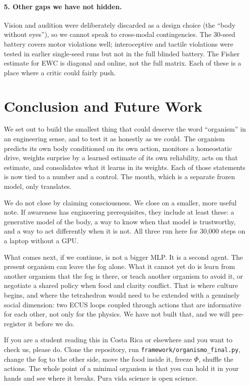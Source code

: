 \documentclass[11pt,a4paper]{article}
\begin{document}
\paragraph{5. Other gaps we have not hidden.} Vision and audition were deliberately discarded as a design choice (the ``body without eyes''), so we cannot speak to cross-modal contingencies. The 30-seed battery covers motor violations well; interoceptive and tactile violations were tested in earlier single-seed runs but not in the full blinded battery. The Fisher estimate for EWC is diagonal and online, not the full matrix. Each of these is a place where a critic could fairly push.

\section{Conclusion and Future Work}

We set out to build the smallest thing that could deserve the word ``organism'' in an engineering sense, and to test it as honestly as we could. The organism predicts its own body conditioned on its own action, monitors a homeostatic drive, weights surprise by a learned estimate of its own reliability, acts on that estimate, and consolidates what it learns in its weights. Each of those statements is now tied to a number and a control. The mouth, which is a separate frozen model, only translates.

We do not close by claiming consciousness. We close on a smaller, more useful note. If awareness has engineering prerequisites, they include at least these: a generative model of the body, a way to know when that model is trustworthy, and a way to act differently when it is not. All three run here for 30,000 steps on a laptop without a GPU.

What comes next, if we continue, is not a bigger MLP. It is a second agent. The present organism can leave the fog alone. What it cannot yet do is learn from another organism that the fog is there, or teach another organism to avoid it, or negotiate a shared policy when food and clarity conflict. That is where culture begins, and where the tetrahedron would need to be extended with a genuinely social dimension: two ECUS loops coupled through actions that are informative for each other, not only for the physics. We have not built that, and we will pre-register it before we do.

If you are a student reading this in Costa Rica or elsewhere and you want to check us, please do. Clone the repository, run \texttt{framework/organismo\_final.py}, change the fog to the other side, move the food inside it, freeze $\Phi$, shuffle the actions. The whole point of a minimal organism is that you can hold it in your hands and see where it breaks. Pura vida science is open science.
\end{document}
